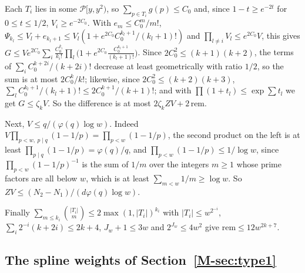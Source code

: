 \documentclass[11pt]{article}
\numberwithin{equation}{section}
\begin{document}
Each $T_i$ lies in some $\mathcal P[y, y^2)$, so $\sum_{p \in T_i} g(p) \le C_0$ and, since $1 - t \ge e^{-2t}$ for $0
\le t \le 1/2$, $V_i \ge e^{-2C_0}$. With $e_m \le C_0^m/m!$, $\Psi_{k_l} \le V_l + e_{k_l + 1} \le V_l (1 + e^{2C_0}
C_0^{k_l + 1}/(k_l + 1)!)$ and $\prod_{l \ne i} V_l \le e^{2C_0} V$, this gives $G \le V e^{2C_0} \sum_i
\frac{C_0^{k_i}}{k_i!} \prod_l \bigl(1 + e^{2C_0} \frac{C_0^{k_l + 1}}{(k_l + 1)!}\bigr)$. Since $2C_0^2 \le (k + 1)(k +
2)$, the terms of $\sum_i C_0^{k + 2i}/(k + 2i)!$ decrease at least geometrically with ratio $1/2$, so the sum is at
most $2C_0^k/k!$; likewise, since $2C_0^2 \le (k + 2)(k + 3)$, $\sum_l C_0^{k_l + 1}/(k_l + 1)! \le 2C_0^{k + 1}/(k +
1)!$; and with $\prod (1 + t_l) \le \exp \sum t_l$ we get $G \le \zeta_k V$. So the difference is at most $2\zeta_k ZV +
2\,\mathrm{rem}$.

Next, $V \le q/(\varphi(q) \log w)$. Indeed $V \prod_{p < w,\ p \mid q}(1 - 1/p) = \prod_{p < w}(1 -
1/p)$, the second product on the left is at least $\prod_{p \mid q}(1 - 1/p) = \varphi(q)/q$, and $\prod_{p < w}(1 -
1/p) \le 1/\log w$, since $\prod_{p < w}(1 - 1/p)^{-1}$ is the sum of $1/m$ over the integers $m \ge 1$ whose prime
factors are all below $w$, which is at least $\sum_{m < w} 1/m \ge \log w$. So $ZV \le (N_2 - N_1)/(d \varphi(q) \log
w)$.

Finally $\sum_{m \le k_i} \binom{|T_i|}{m} \le 2 \max(1, |T_i|)^{k_i}$ with $|T_i| \le w^{2^{-i}}$, $\sum_i
2^{-i}(k + 2i) \le 2k + 4$, $J_w + 1 \le 3w$ and $2^{J_w} \le 4w^2$ give $\mathrm{rem} \le 12 w^{2k + 7}$.

\subsection*{The spline weights of Section~\ref{M-sec:type1}}
\end{document}
